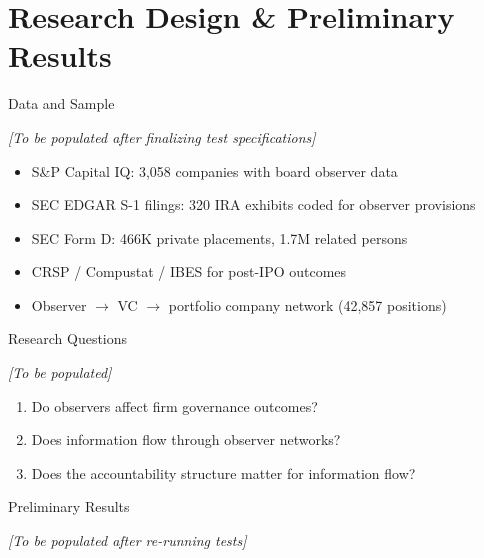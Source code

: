 \documentclass[aspectratio=169,12pt]{beamer}
\begin{document}
\section{Research Design \& Preliminary Results}

\begin{frame}{Data and Sample}
\begin{center}
\Large\textcolor{harvardgray}{\textit{[To be populated after finalizing test specifications]}}
\end{center}
\vspace{1em}
\begin{itemize}
\item S\&P Capital IQ: 3,058 companies with board observer data
\item SEC EDGAR S-1 filings: 320 IRA exhibits coded for observer provisions
\item SEC Form D: 466K private placements, 1.7M related persons
\item CRSP / Compustat / IBES for post-IPO outcomes
\item Observer $\rightarrow$ VC $\rightarrow$ portfolio company network (42,857 positions)
\end{itemize}
\end{frame}

\begin{frame}{Research Questions}
\begin{center}
\Large\textcolor{harvardgray}{\textit{[To be populated]}}
\end{center}
\vspace{1em}
\begin{enumerate}
\item Do observers affect firm governance outcomes?
\item Does information flow through observer networks?
\item Does the accountability structure matter for information flow?
\end{enumerate}
\end{frame}

\begin{frame}{Preliminary Results}
\begin{center}
\Large\textcolor{harvardgray}{\textit{[To be populated after re-running tests]}}
\end{center}
\end{frame}
\end{document}
